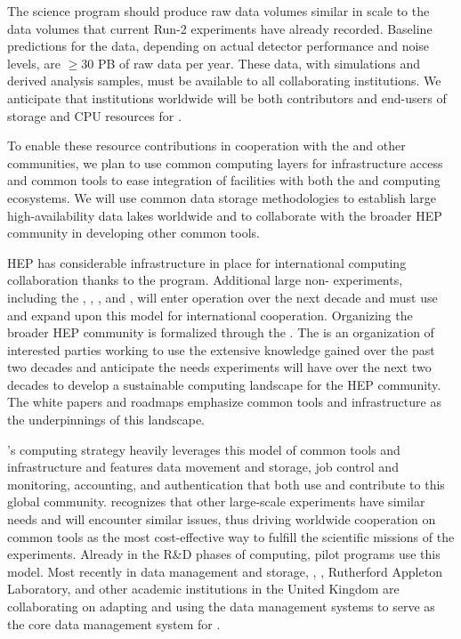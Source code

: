 The  science program should produce raw data volumes similar in scale to the data volumes that current  Run-2 experiments have already recorded.  Baseline predictions for the  data, depending on actual detector performance and noise levels, are $\ge 30$ PB of raw data per year.  These data, with simulations and derived analysis samples, must be available to all collaborating institutions.  We anticipate that institutions worldwide will be both contributors and end-users of storage and CPU resources for .

To enable these resource contributions in cooperation with the  and other communities, we plan to use common computing layers for infrastructure access and common tools to ease integration of facilities with both the  and  computing ecosystems.  We will use common data storage methodologies to establish large high-availability data lakes worldwide  and to collaborate with the broader HEP community in developing other common tools.


HEP has considerable infrastructure in place for international computing collaboration thanks to the  program.  Additional large non- experiments, including the , , , and ,  will enter operation over the next decade and must use and expand upon this model for international cooperation.  Organizing the broader HEP community is formalized through the  \cite{Alves:2017she}.  The  is an organization of interested parties working to use the extensive knowledge gained over the past two decades and anticipate the needs experiments will have over the next two decades to develop a sustainable computing landscape for the HEP community.  The  white papers and roadmaps emphasize common tools and infrastructure as the underpinnings of this landscape.

's computing strategy heavily leverages this model of common tools and infrastructure and features data movement and storage, job control and monitoring, accounting, and authentication that both use and contribute to this global community.    recognizes that other large-scale experiments have similar needs and will encounter similar issues, thus driving worldwide cooperation on common tools as the most cost-effective way to fulfill the scientific missions of the experiments.  Already in the R\&D phases of  computing,  pilot programs use this model.  Most recently in data management and storage, , , Rutherford Appleton Laboratory, and other academic institutions in the United Kingdom are collaborating on adapting and using the  data management systems \cite{Barisits:2019fyl}  to serve as the core data management system for .

